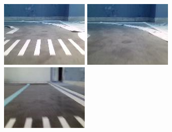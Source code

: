 \begin{figure}
\begin{minipage}[t]{0.3\linewidth}
\includegraphics[width=\textwidth]{images/Learningprocess/3.jpg}
\end{minipage}
\begin{minipage}[t]{0.3\linewidth}
    \includegraphics[width=\textwidth]{images/Learningprocess/4.jpg}
\end{minipage}
	\begin{minipage}[t]{0.3\linewidth}
\includegraphics[width=\textwidth]{images/Learningprocess/5.jpg}

\end{minipage}
\end{figure}
